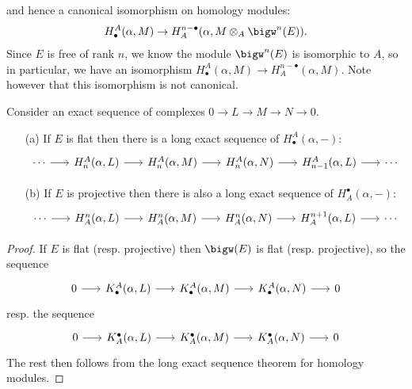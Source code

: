 and hence a canonical isomorphism on homology modules:
\begin{align}\label{Koszul complex dual prop}
H^A_\bullet(\alpha,M)\to H_A^{n-\bullet}(\alpha,M\otimes_A\bigw^n(E)).
\end{align}
Since $E$ is free of rank $n$, we know the module $\bigw^n(E)$ is isomorphic to $A$, so in particular, we have an isomorphism $H_\bullet^A(\alpha,M)\to H_A^{n-\bullet}(\alpha,M)$. Note however that this isomorphism is not canonical.
\begin{proposition}\label{Koszul complex long exact sequence}
Consider an exact sequence of complexes $0\to L\to M\to N\to 0$.
\begin{itemize}
\item[(a)] If $E$ is flat then there is a long exact sequence of $H_\bullet^A(\alpha,-)$:
\[\begin{tikzcd}[column sep=6mm]
\cdots\ar[r]&H_n^A(\alpha,L)\ar[r]&H_n^A(\alpha,M)\ar[r]&H_n^A(\alpha,N)\ar[r]&H_{n-1}^A(\alpha,L)\ar[r]&\cdots
\end{tikzcd}\] 
\item[(b)] If $E$ is projective then there is also a long exact sequence of $H^\bullet_A(\alpha,-)$:
\[\begin{tikzcd}[column sep=6mm]
\cdots\ar[r]&H^n_A(\alpha,L)\ar[r]&H^n_A(\alpha,M)\ar[r]&H^n_A(\alpha,N)\ar[r]&H^{n+1}_A(\alpha,L)\ar[r]&\cdots
\end{tikzcd}\] 
\end{itemize}
\end{proposition}
\begin{proof}
If $E$ is flat (resp. projective) then $\bigw(E)$ is flat (resp. projective), so the sequence
\[\begin{tikzcd}[column sep=6mm]
0\ar[r]&K_\bullet^A(\alpha,L)\ar[r]&K_\bullet^A(\alpha,M)\ar[r]&K_\bullet^A(\alpha,N)\ar[r]&0
\end{tikzcd}\]
resp. the sequence
\[\begin{tikzcd}[column sep=6mm]
0\ar[r]&K^\bullet_A(\alpha,L)\ar[r]&K^\bullet_A(\alpha,M)\ar[r]&K^\bullet_A(\alpha,N)\ar[r]&0
\end{tikzcd}\]
The rest then follows from the long exact sequence theorem for homology modules.
\end{proof}
